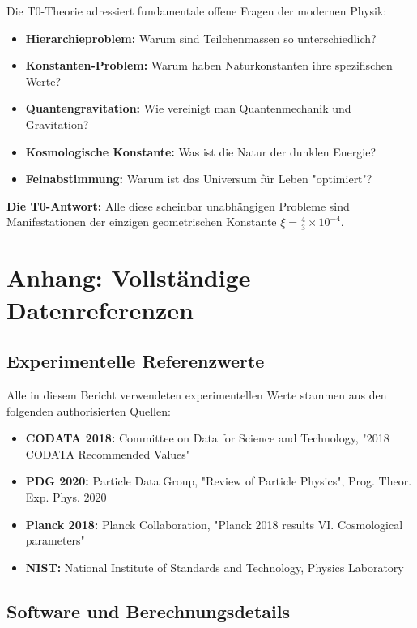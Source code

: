 \documentclass[11pt,a4paper]{article}
\begin{document}
	Die T0-Theorie adressiert fundamentale offene Fragen der modernen Physik:
	
	\begin{itemize}
		\item \textbf{Hierarchieproblem:} Warum sind Teilchenmassen so unterschiedlich?
		\item \textbf{Konstanten-Problem:} Warum haben Naturkonstanten ihre spezifischen Werte?
		\item \textbf{Quantengravitation:} Wie vereinigt man Quantenmechanik und Gravitation?
		\item \textbf{Kosmologische Konstante:} Was ist die Natur der dunklen Energie?
		\item \textbf{Feinabstimmung:} Warum ist das Universum für Leben "optimiert"?
	\end{itemize}
	
	\textcolor{t0green}{\textbf{Die T0-Antwort:}} Alle diese scheinbar unabhängigen Probleme sind Manifestationen der einzigen geometrischen Konstante $\xi = \frac{4}{3} \times 10^{-4}$.
	
		\section{Anhang: Vollständige Datenreferenzen}
	
	\subsection{Experimentelle Referenzwerte}
	
	Alle in diesem Bericht verwendeten experimentellen Werte stammen aus den folgenden authorisierten Quellen:
	
	\begin{itemize}
		\item \textbf{CODATA 2018:} Committee on Data for Science and Technology, "2018 CODATA Recommended Values"
		\item \textbf{PDG 2020:} Particle Data Group, "Review of Particle Physics", Prog. Theor. Exp. Phys. 2020
		\item \textbf{Planck 2018:} Planck Collaboration, "Planck 2018 results VI. Cosmological parameters"
		\item \textbf{NIST:} National Institute of Standards and Technology, Physics Laboratory
	\end{itemize}
	
	\subsection{Software und Berechnungsdetails}
	
\end{document}

